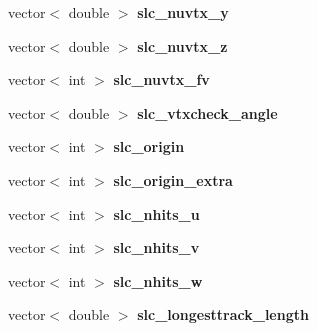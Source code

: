 \begin{DoxyCompactItemize}
\item 
\hypertarget{classUBXSecEvent_aabba0cbb738793a9713deb8888d3919b}{vector$<$ double $>$ {\bfseries slc\-\_\-nuvtx\-\_\-y}}\label{classUBXSecEvent_aabba0cbb738793a9713deb8888d3919b}

\item 
\hypertarget{classUBXSecEvent_abc7e1a40fd182e817c83e5e4066eeb07}{vector$<$ double $>$ {\bfseries slc\-\_\-nuvtx\-\_\-z}}\label{classUBXSecEvent_abc7e1a40fd182e817c83e5e4066eeb07}

\item 
\hypertarget{classUBXSecEvent_ae5160345d6d863bbe3ad2abb19298dc6}{vector$<$ int $>$ {\bfseries slc\-\_\-nuvtx\-\_\-fv}}\label{classUBXSecEvent_ae5160345d6d863bbe3ad2abb19298dc6}

\item 
\hypertarget{classUBXSecEvent_af9855bb4f1c558d9032c3059beb49015}{vector$<$ double $>$ {\bfseries slc\-\_\-vtxcheck\-\_\-angle}}\label{classUBXSecEvent_af9855bb4f1c558d9032c3059beb49015}

\item 
\hypertarget{classUBXSecEvent_aebb1b1e843015c57cd10b411682dbb2e}{vector$<$ int $>$ {\bfseries slc\-\_\-origin}}\label{classUBXSecEvent_aebb1b1e843015c57cd10b411682dbb2e}

\item 
\hypertarget{classUBXSecEvent_ac1532ccdcb92b158c2393ec6a2a816f8}{vector$<$ int $>$ {\bfseries slc\-\_\-origin\-\_\-extra}}\label{classUBXSecEvent_ac1532ccdcb92b158c2393ec6a2a816f8}

\item 
\hypertarget{classUBXSecEvent_a52bec741eadb5ef5f4bf1c2322707d20}{vector$<$ int $>$ {\bfseries slc\-\_\-nhits\-\_\-u}}\label{classUBXSecEvent_a52bec741eadb5ef5f4bf1c2322707d20}

\item 
\hypertarget{classUBXSecEvent_a5ade1b25620def646196c0d7fa3ad7f3}{vector$<$ int $>$ {\bfseries slc\-\_\-nhits\-\_\-v}}\label{classUBXSecEvent_a5ade1b25620def646196c0d7fa3ad7f3}

\item 
\hypertarget{classUBXSecEvent_ac20d2a610a09c19bb6c10e80ec735b12}{vector$<$ int $>$ {\bfseries slc\-\_\-nhits\-\_\-w}}\label{classUBXSecEvent_ac20d2a610a09c19bb6c10e80ec735b12}

\item 
\hypertarget{classUBXSecEvent_ac3a7dd3d816188675925b73049cddc2a}{vector$<$ double $>$ {\bfseries slc\-\_\-longesttrack\-\_\-length}}\label{classUBXSecEvent_ac3a7dd3d816188675925b73049cddc2a}


\end{DoxyCompactItemize}
